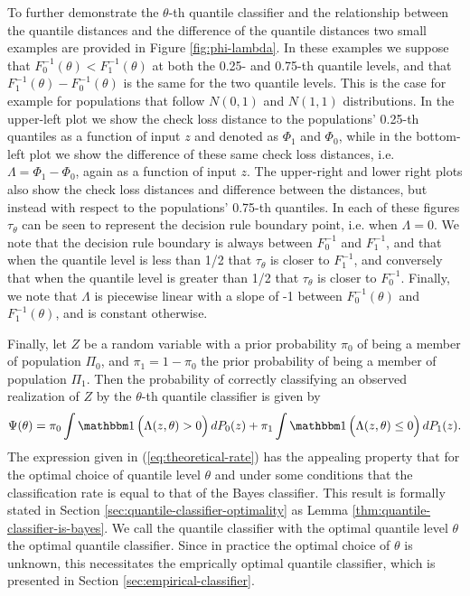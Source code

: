 To further demonstrate the $\theta$-th quantile classifier and the relationship
between the quantile distances and the difference of the quantile distances two
small examples are provided in Figure \ref{fig:phi-lambda}.  In these examples
we suppose that $F_0^{-1}(\theta) < F_1^{-1}(\theta)$ at both the 0.25- and
0.75-th quantile levels, and that $F_1^{-1}(\theta) - F_0^{-1}(\theta)$ is the
same for the two quantile levels.  This is the case for example for populations
that follow $N(0, 1)$ and $N(1, 1)$ distributions.  In the upper-left plot we
show the check loss distance to the populations' 0.25-th quantiles as a function
of input $z$ and denoted as $\Phi_1$ and $\Phi_0$, while in the bottom-left plot
we show the difference of these same check loss distances, i.e.
$\Lambda = \Phi_1 - \Phi_0$, again as a function of input $z$.  The upper-right
and lower right plots also show the check loss distances and difference between
the distances, but instead with respect to the populations' 0.75-th quantiles.
In each of these figures $\tau_{\theta}$ can be seen to represent the decision
rule boundary point, i.e. when $\Lambda = 0$.  We note that the decision rule
boundary is always between $F_{0}^{-1}$ and $F_{1}^{-1}$, and that when the
quantile level is less than 1/2 that $\tau_{\theta}$ is closer to $F_{1}^{-1}$,
and conversely that when the quantile level is greater than 1/2 that
$\tau_{\theta}$ is closer to $F_{0}^{-1}$.  Finally, we note that $\Lambda$ is
piecewise linear with a slope of -1 between $F_{0}^{-1}(\theta)$ and
$F_{1}^{-1}(\theta)$, and is constant otherwise.




Finally, let $Z$ be a random variable with a prior probability $\pi_0$ of being
a member of population $\Pi_0$, and $\pi_1 = 1 - \pi_0$ the prior probability of
being a member of population $\Pi_1$.  Then the probability of correctly
classifying an observed realization of $Z$ by the $\theta$-th quantile
classifier is given by
\begin{equation}
  \label{eq:theoretical-rate}
  \Psi(\theta) =
  \pi_0 \int \ind\Big( \Lambda(z, \theta) > 0 \Big)\, dP_0(z) +
  \pi_1 \int \ind\Big(\Lambda(z, \theta) \leq 0 \Big)\, dP_1(z).
\end{equation}
The expression given in (\ref{eq:theoretical-rate}) has the appealing property
that for the optimal choice of quantile level $\theta$ and under some conditions
that the classification rate is equal to that of the Bayes classifier.  This
result is formally stated in Section \ref{sec:quantile-classifier-optimality} as
Lemma \ref{thm:quantile-classifier-is-bayes}.  We call the quantile classifier
with the optimal quantile level $\theta$ the optimal quantile classifier.  Since
in practice the optimal choice of $\theta$ is unknown, this necessitates the
emprically optimal quantile classifier, which is presented in Section
\ref{sec:empirical-classifier}.


